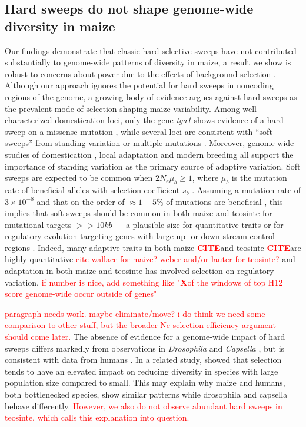 \documentclass{pnastwo}
\newcommand{\jri}[1]{\textcolor{red}{\scriptsize #1}}
\newcommand{\citex}{\textcolor{red}{\bf CITE}}
\newcommand{\X}{\textcolor{red}{\bf X}}
\begin{document}
\begin{article}
\subsection{Hard sweeps do not shape genome-wide diversity in maize}

Our findings demonstrate that classic hard selective sweeps have not contributed substantially to genome-wide patterns of diversity in maize, a result we show is robust to concerns about power due to the effects of background selection  \cite{enard2014}. 
Although our approach ignores the potential for hard sweeps in noncoding regions of the genome, a growing body of evidence argues against hard sweeps as the prevalent mode of selection shaping maize variability. 
Among well-characterized domestication loci, only the gene \emph{tga1} shows evidence of a hard sweep on a missense mutation \cite{wang2015}, while several loci are consistent with ``soft sweeps''  from standing variation \cite{studer2011,gallavotti2004role} or multiple mutations \cite{wills2013}. 
Moreover, genome-wide studies of domestication \cite{hufford2012},  local adaptation \cite{Takuno15062015} and modern breeding \cite{beissinger2014} all support the importance of standing variation as the primary source of adaptive variation. 
Soft sweeps are expected to be common when $2N_e\mu_b \ge 1$, where $\mu_b$ is the mutation rate of beneficial alleles with selection coefficient $s_b$ \cite{messer2013population}.  
Assuming a mutation rate of $3 \times 10^{-8}$ \citep{clark2005} and that on the order of $\approx 1-5\%$ of mutations are beneficial \citep{eyre2007distribution}, this implies that soft sweeps should be common in both maize and teosinte for mutational targets $>>10kb$ --- a plausible size for quantitative traits or for regulatory evolution targeting genes with large up- or down-stream control regions \citep[e.g.][]{studer2011}. 
Indeed, many adaptive traits in both maize \citex and teosinte \citex are highly quantitative \jri{cite wallace for maize? weber and/or lauter for teosinte?} and adaptation in both maize \citep{hufford2012} and teosinte \citep{pyhajarvi2013complex} has involved selection on regulatory variation.  \jri{if number is nice, add something like "\X of the windows of top H12 score genome-wide occur outside of genes"}

\jri{paragraph needs work. maybe eliminate/move? i do think we need some comparison to other stuff, but the broader Ne-selection efficiency argument should come later.}
The absence of evidence for a genome-wide impact of hard sweeps differs markedly from observations in \emph{Drosophila} \cite{sattath2011} and \emph{Capsella} \cite{williamson2014}, but is consistent with data from humans \cite{hernandez2011,pritchard2010genetics}. 
In a related study, \cite{corbett2015} showed that selection tends to have an elevated impact on reducing diversity in species with large population size compared to small. This may explain why maize and humans, both bottlenecked species, show similar patterns while drosophila and capsella behave differently. \textcolor{red}{However, we also do not observe abundant hard sweeps in teosinte, which calls this explanation into question.}


\end{article}
\end{document}
